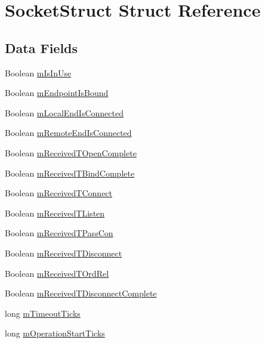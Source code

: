 \hypertarget{struct_socket_struct}{}\section{Socket\+Struct Struct Reference}
\label{struct_socket_struct}
\subsection*{Data Fields}
\begin{DoxyCompactItemize}
\item 
Boolean \hyperlink{struct_socket_struct_a6932ba163e69b1162b0fec5b695f249d}{m\+Is\+In\+Use}
\item 
Boolean \hyperlink{struct_socket_struct_afc08fe4eacc3f47dcb7dee3bb9e08662}{m\+Endpoint\+Is\+Bound}
\item 
Boolean \hyperlink{struct_socket_struct_abd38b54aecec4466a61e8318990191f6}{m\+Local\+End\+Is\+Connected}
\item 
Boolean \hyperlink{struct_socket_struct_af1876c043ddf26093b398fb92e9177ce}{m\+Remote\+End\+Is\+Connected}
\item 
Boolean \hyperlink{struct_socket_struct_af5ac66865315fa67519302739077223c}{m\+Received\+T\+Open\+Complete}
\item 
Boolean \hyperlink{struct_socket_struct_aa3eba4ea12efa788e1932096fc562be2}{m\+Received\+T\+Bind\+Complete}
\item 
Boolean \hyperlink{struct_socket_struct_a6d76324df5329ea99df49489b7e24ad2}{m\+Received\+T\+Connect}
\item 
Boolean \hyperlink{struct_socket_struct_a42fd067318779307c53bd197baffe39b}{m\+Received\+T\+Listen}
\item 
Boolean \hyperlink{struct_socket_struct_a45eede39761f530b51360215c2a65ed0}{m\+Received\+T\+Pass\+Con}
\item 
Boolean \hyperlink{struct_socket_struct_a0bd3741c40f421dd4c61eba90502d9f5}{m\+Received\+T\+Disconnect}
\item 
Boolean \hyperlink{struct_socket_struct_aa8058ed78e968a4dfeb45e9b62524d27}{m\+Received\+T\+Ord\+Rel}
\item 
Boolean \hyperlink{struct_socket_struct_a2852146af35864124736383a3fc5e305}{m\+Received\+T\+Disconnect\+Complete}
\item 
long \hyperlink{struct_socket_struct_ad5246a549c7d7a3440f47b6f6071ce59}{m\+Timeout\+Ticks}
\item 
long \hyperlink{struct_socket_struct_ac739e32c6d9043018e2021f6b74f0ef2}{m\+Operation\+Start\+Ticks}

\end{DoxyCompactItemize}
